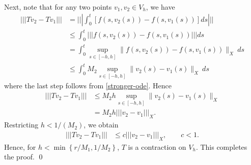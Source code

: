 \documentclass[12pt,reqno]{amsart}
\numberwithin{equation}{section}  %
\numberwithin{figure}{section}
\theoremstyle{plain}
\theoremstyle{definition}
\theoremstyle{remark}
\begin{document}
%
%
Next, note that for any two points $v_1, v_2 \in
V_h$, we have
%
%
\begin{equation}
	\label{cont-part-1}
	\begin{split}
		| | | Tv_2 - Tv_1 | | | 
		& = | | | \int_0^t \left[ f(s, v_2(s) ) - f(s, v_1 (s) ) \right]ds | | |
		\\
		& \le \int_0^t | | | f(s, v_2(s) ) - f(s, v_1 (s) ) | | | ds
		\\
		& = \int_0^t \sup_{s \in [-h, h]} \|f(s, v_2(s) ) - f(s, v_1 (s) )\|_X \ ds
		\\
		& \le \int_0^t M_2 \sup_{s \in [-h, h]} \| v_2(s) - v_1 (s)\|_X \
		ds
		\end{split}
\end{equation}
%
%
where the last step follows from \eqref{stronger-ode}.
Hence
\begin{equation*}
	\begin{split}
		| | | Tv_2 - Tv_1 | | | 
		& \le M_2 h \sup_{s \in [-h, h]} \| v_2(s)  - v_1 (s) \|_{ X}
		\\
		& = M_2 h   | | | v_2 - v_1 | | |_X.  
	\end{split}
\end{equation*}
%
%
Restricting $h < 1/(M_2)$, we obtain
\begin{equation*}
	\begin{split}
		| | | Tv_2 - Tv_1 | | | & \le c | | | v_2 - v_1 | | |_X, \qquad c <1. 
	\end{split}
\end{equation*}
Hence, for $h < \min\left\{r/M_1, 1/M_2  \right\}$, $T$ is a contraction on
$V_h$.  This completes \\ the proof. \qed
%
%
\appendix
\end{document}
